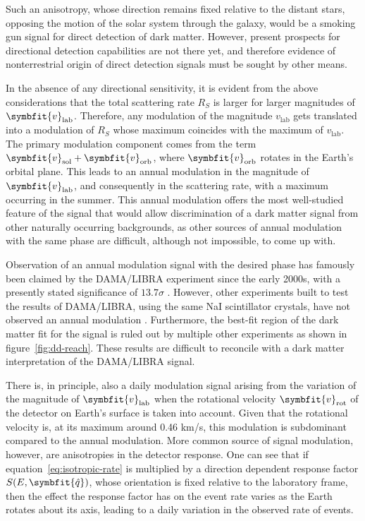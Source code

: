 \documentclass[b5paper, 10pt, twoside]{book}
\renewcommand{\vec}[1]{\symbfit{#1}}
\newcommand{\unitv}[1]{\symbfit{\hat{#1}}}
\begin{document}
Such an anisotropy, whose direction remains fixed relative to the distant stars, opposing the motion of the solar system through the galaxy, would be a smoking gun signal for direct detection of dark matter. However, present prospects for directional detection capabilities are not there yet, and therefore evidence of nonterrestrial origin of direct detection signals must be sought by other means.

In the absence of any directional sensitivity, it is evident from the above considerations that the total scattering rate $R_S$ is larger for larger magnitudes of $\vec{v}_\text{lab}$. Therefore, any modulation of the magnitude $v_\text{lab}$ gets translated into a modulation of $R_S$ whose maximum coincides with the maximum of $v_\text{lab}$. The primary modulation component comes from the term $\vec{v}_\text{sol}+\vec{v}_\text{orb}$, where $\vec{v}_\text{orb}$ rotates in the Earth's orbital plane. This leads to an annual modulation in the magnitude of $\vec{v}_\text{lab}$, and consequently in the scattering rate, with a maximum occurring in the summer. This annual modulation offers the most well-studied feature of the signal that would allow discrimination of a dark matter signal from other naturally occurring backgrounds, as other sources of annual modulation with the same phase are difficult, although not impossible, to come up with.

Observation of an annual modulation signal with the desired phase has famously been claimed by the DAMA/LIBRA experiment since the early 2000s, with a presently stated significance of $13.7\sigma$ \parencite{BernabeiEtAl2023}. However, other experiments built to test the results of DAMA/LIBRA, using the same NaI scintillator crystals, have not observed an annual modulation \parencites{DMIce2017, COSINE1002019, COSINE1002024, KIMS2019, ANAIS2024}. Furthermore, the best-fit region of the dark matter fit for the signal is ruled out by multiple other experiments as shown in figure~\ref{fig:dd-reach}.  These results are difficult to reconcile with a dark matter interpretation of the DAMA/LIBRA signal.

There is, in principle, also a daily modulation signal arising from the variation of the magnitude of $\vec{v}_\text{lab}$ when the rotational velocity $\vec{v}_\text{rot}$ of the detector on Earth's surface is taken into account. Given that the rotational velocity is, at its maximum around 0.46 km/s, this modulation is subdominant compared to the annual modulation. More common source of signal modulation, however, are anisotropies in the detector response. One can see that if equation~\eqref{eq:isotropic-rate} is multiplied by a direction dependent response factor $S(E,\unitv{q})$, whose orientation is fixed relative to the laboratory frame, then the effect the response factor has on the event rate varies as the Earth rotates about its axis, leading to a daily variation in the observed rate of events.
\end{document}
